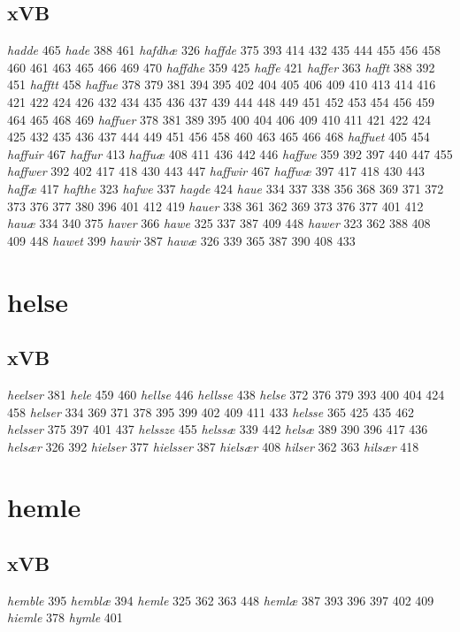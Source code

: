 \documentclass[a4paper,twocolumn]{article}
\begin{document}
\subsection{xVB}
\label{sec:org1be4843}
\emph{hadde} 465 \emph{hade} 388 461 \emph{hafdhæ} 326 \emph{haffde} 375 393 414 432 435 444 455 456 458 460 461 463 465 466 469 470 \emph{haffdhe} 359 425 \emph{haffe} 421 \emph{haffer} 363 \emph{hafft} 388 392 451 \emph{hafftt} 458 \emph{haffue} 378 379 381 394 395 402 404 405 406 409 410 413 414 416 421 422 424 426 432 434 435 436 437 439 444 448 449 451 452 453 454 456 459 464 465 468 469 \emph{haffuer} 378 381 389 395 400 404 406 409 410 411 421 422 424 425 432 435 436 437 444 449 451 456 458 460 463 465 466 468 \emph{haffuet} 405 454 \emph{haffuir} 467 \emph{haffur} 413 \emph{haffuæ} 408 411 436 442 446 \emph{haffwe} 359 392 397 440 447 455 \emph{haffwer} 392 402 417 418 430 443 447 \emph{haffwir} 467 \emph{haffwæ} 397 417 418 430 443 \emph{haffæ} 417 \emph{hafthe} 323 \emph{hafwe} 337 \emph{hagde} 424 \emph{haue} 334 337 338 356 368 369 371 372 373 376 377 380 396 401 412 419 \emph{hauer} 338 361 362 369 373 376 377 401 412 \emph{hauæ} 334 340 375 \emph{haver} 366 \emph{hawe} 325 337 387 409 448 \emph{hawer} 323 362 388 408 409 448 \emph{hawet} 399 \emph{hawir} 387 \emph{hawæ} 326 339 365 387 390 408 433 
\section{helse}
\label{sec:org55402ec}
\subsection{xVB}
\label{sec:orgb7ecf0c}
\emph{heelser} 381 \emph{hele} 459 460 \emph{hellse} 446 \emph{hellsse} 438 \emph{helse} 372 376 379 393 400 404 424 458 \emph{helser} 334 369 371 378 395 399 402 409 411 433 \emph{helsse} 365 425 435 462 \emph{helsser} 375 397 401 437 \emph{helssze} 455 \emph{helssæ} 339 442 \emph{helsæ} 389 390 396 417 436 \emph{helsær} 326 392 \emph{hielser} 377 \emph{hielsser} 387 \emph{hielsær} 408 \emph{hilser} 362 363 \emph{hilsær} 418 
\section{hemle}
\label{sec:orgc7e233e}
\subsection{xVB}
\label{sec:org4bfcea2}
\emph{hemble} 395 \emph{hemblæ} 394 \emph{hemle} 325 362 363 448 \emph{hemlæ} 387 393 396 397 402 409 \emph{hiemle} 378 \emph{hymle} 401 
\end{document}

